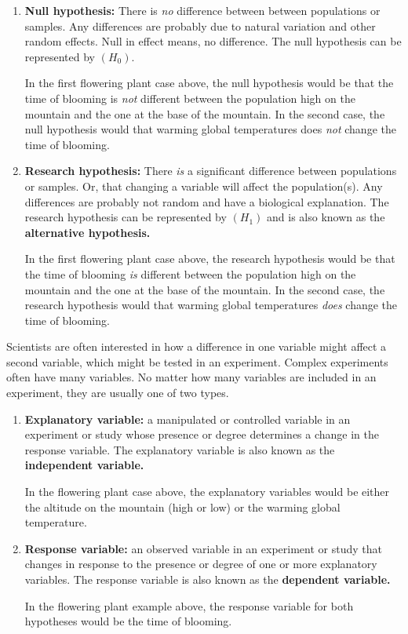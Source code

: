 \documentclass[12pt]{exam}
\begin{document}
\begin{enumerate}
	\item \textbf{Null hypothesis:} There is \emph{no} difference between between populations or samples.
	Any differences are probably due to natural variation and other random effects. Null in effect means, no difference. The null hypothesis can be represented by $\left(H_0\right)$.
	
	In the first flowering plant case above, the null hypothesis would be that the 
	time of blooming is \emph{not} different between the population high on the mountain 
	and the one at the base of the mountain. In the second case, the null
	hypothesis would that warming global temperatures does \emph{not} change the time
	of blooming.
	
	\item \textbf{Research hypothesis:} There \emph{is} a significant difference between populations or samples. Or,  that changing a variable will affect the population(s). Any differences are probably not random
	and have a biological explanation. The research hypothesis can be represented by $\left(H_1\right)$ and is also known as the \textbf{alternative
	hypothesis.}
	
	In the first flowering plant case above, the research hypothesis would be that the 
	time of blooming \emph{is} different between the population high on the mountain 
	and the one at the base of the mountain. In the second case, the research
	hypothesis would that warming global temperatures \emph{does} change the time
	of blooming.

\end{enumerate}

Scientists are often interested in how a difference in one variable might 
affect a second variable, which might be tested in an experiment. Complex 
experiments often have many variables. No matter how many variables
are included in an experiment, they are usually one of two types.

\begin{enumerate}
\item
  \textbf{Explanatory variable:} a manipulated or controlled variable in an experiment
  or study whose presence or degree determines a change in the response
  variable. The explanatory variable is also known as the \textbf{independent
  variable.}
  
  In the flowering plant case above, the explanatory variables would be
  either the altitude on the mountain (high or low) or the warming global 
  temperature.
   
\item
  \textbf{Response variable:} an observed variable in an experiment or
  study that changes in response to the presence or degree of one
  or more explanatory variables. The response variable is also known as the
  \textbf{dependent variable.} 
  
  In the flowering plant example above, the response variable for both
  hypotheses would be the time of blooming.
  
\end{enumerate}
\end{document}
